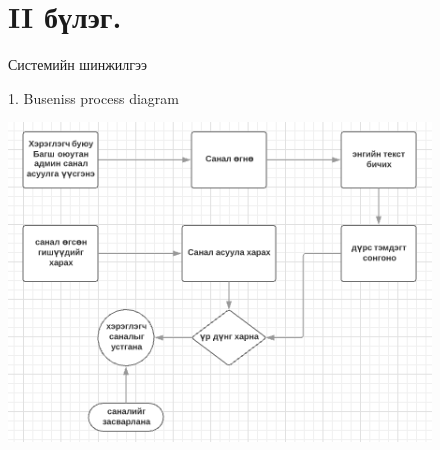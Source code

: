 \documentclass[12pt]{article}
\begin{document}
	
 \begin{figure}  \section       {II бүлэг.}  Системийн шинжилгээ
	
	1.   Buseniss process diagram
	
	
		\centering
		\includegraphics[width=0.7\linewidth]{./p}
		\caption{}
		\label{fig:p}
	\end{figure}
	
	
	
\end{document}
